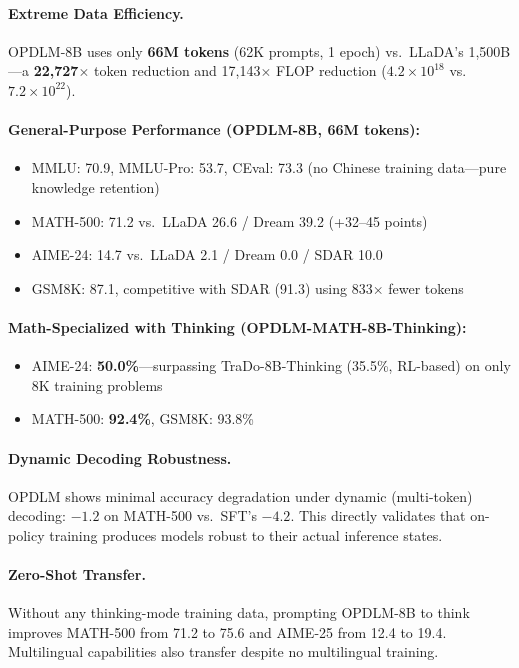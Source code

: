 \documentclass[11pt,a4paper]{article}
\begin{document}
\paragraph{Extreme Data Efficiency.} OPDLM-8B uses only \textbf{66M tokens} (62K prompts, 1 epoch) vs.\ LLaDA's 1,500B---a \textbf{22,727$\times$} token reduction and 17,143$\times$ FLOP reduction ($4.2 \times 10^{18}$ vs.\ $7.2 \times 10^{22}$).

\paragraph{General-Purpose Performance (OPDLM-8B, 66M tokens):}
\begin{itemize}
\item MMLU: 70.9, MMLU-Pro: 53.7, CEval: 73.3 (no Chinese training data---pure knowledge retention)
\item MATH-500: 71.2 vs.\ LLaDA 26.6 / Dream 39.2 (+32--45 points)
\item AIME-24: 14.7 vs.\ LLaDA 2.1 / Dream 0.0 / SDAR 10.0
\item GSM8K: 87.1, competitive with SDAR (91.3) using 833$\times$ fewer tokens
\end{itemize}

\paragraph{Math-Specialized with Thinking (OPDLM-MATH-8B-Thinking):}
\begin{itemize}
\item AIME-24: \textbf{50.0\%}---surpassing TraDo-8B-Thinking (35.5\%, RL-based) on only 8K training problems
\item MATH-500: \textbf{92.4\%}, GSM8K: 93.8\%
\end{itemize}

\paragraph{Dynamic Decoding Robustness.} OPDLM shows minimal accuracy degradation under dynamic (multi-token) decoding: $-1.2$ on MATH-500 vs.\ SFT's $-4.2$. This directly validates that on-policy training produces models robust to their actual inference states.

\paragraph{Zero-Shot Transfer.} Without any thinking-mode training data, prompting OPDLM-8B to think improves MATH-500 from 71.2 to 75.6 and AIME-25 from 12.4 to 19.4. Multilingual capabilities also transfer despite no multilingual training.
\end{document}
